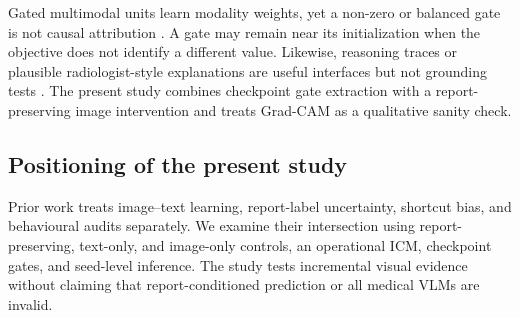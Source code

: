 Gated multimodal units learn modality weights, yet a non-zero or balanced gate
is not causal attribution \citep{arevalo2017gmu}. A gate may remain near its
initialization when the objective does not identify a different value. Likewise,
reasoning traces or plausible radiologist-style explanations are useful
interfaces but not grounding tests \citep{myronenko2025reasoningcxr}. The
present study combines checkpoint gate extraction with a report-preserving
image intervention and treats Grad-CAM as a qualitative sanity check.

\subsection{Positioning of the present study}
Prior work treats image--text learning, report-label uncertainty, shortcut bias,
and behavioural audits separately. We examine their intersection using
report-preserving, text-only, and image-only controls, an operational ICM,
checkpoint gates, and seed-level inference. The study tests incremental visual
evidence without claiming that report-conditioned prediction or all medical
VLMs are invalid.
